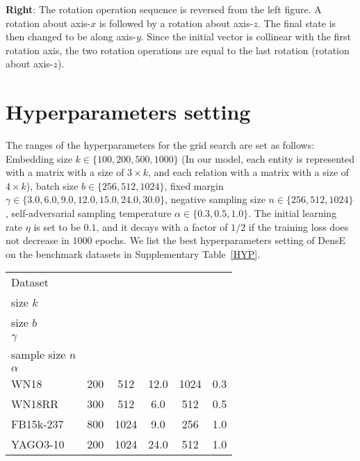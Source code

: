 \documentclass[11pt]{article}
\begin{document}
\textbf{Right}: The rotation operation sequence is reversed from the left figure. A rotation about axis-\(x\) is followed by a rotation about axis-\(z\). The final state is then changed to be along axis-\(y\). Since the initial vector is collinear with the first rotation axis, the two rotation operations are equal to the last rotation (rotation about axis-\(z\)). 

\section{Hyperparameters setting}
The ranges of the hyperparameters for the grid search are set as follows: Embedding size \(k \in \{100, 200, 500, 1000\}\) (In our model, each entity is represented with a matrix with a size of \(3 \times k\), and each relation with a matrix with a size of \(4 \times k\)), batch size \(b \in \{256, 512, 1024\}\), fixed margin \(\gamma \in \{3.0, 6.0, 9.0, 12.0, 15.0, 24.0, 30.0\}\), negative sampling size \(n \in \{256, 512, 1024\}\), self-adversarial sampling temperature  \(\alpha \in \{0.3, 0.5, 1.0\}\). The initial learning rate \(\eta\) is set to be \(0.1\), and it decays with a factor of \(1/2\) if the training loss does not decrease in \(1000\) epochs. We list the best hyperparameters setting of DensE on the benchmark datasets in Supplementary Table~\ref{HYP}.
\begin{table*}[h!]
\centering
\caption{Hyperparameters settings of DensE in this study.}

 \begin{tabular}{ l c c c c c  }
  \toprule
  Dataset  & \Centerstack{Embedding \\ size \(k\)} & \Centerstack{Batch \\ size \(b\)}  & \Centerstack{Margin \\ \(\gamma\)}  & \Centerstack{Negative \\sample size \(n\)}  & \Centerstack{adv temperature \\ \(\alpha\)} \\  
  \midrule
  WN18  & 200    & 512  & 12.0   & 1024   & 0.3 \\ 
  WN18RR & 300   & 512  & 6.0  & 512  & 0.5   \\
  FB15k-237 & 800   & 1024  & 9.0   & 256   & 1.0\\ 
  YAGO3-10    & 200    & 1024  & 24.0   & 512   & 1.0 \\ 
 \bottomrule
\end{tabular} 
\label{HYP}
\end{table*}
\end{document}
